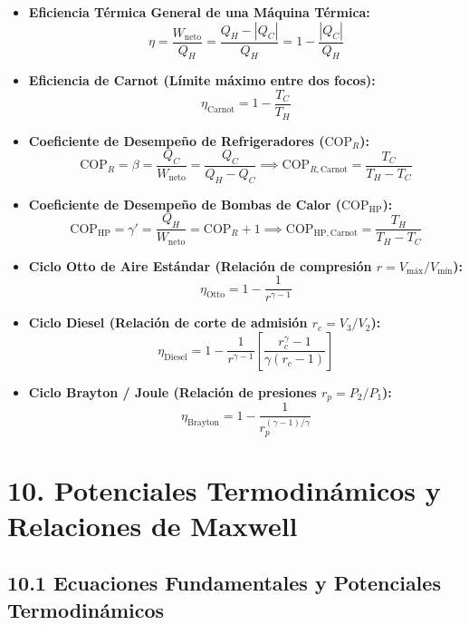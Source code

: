 \documentclass[11pt,a4paper]{article}
\begin{document}
\begin{itemize}
  \item \textbf{Eficiencia Térmica General de una Máquina Térmica:}
  \[
    \eta = \frac{W_{\text{neto}}}{Q_H} = \frac{Q_H - |Q_C|}{Q_H} = 1 - \frac{|Q_C|}{Q_H}
  \]
  \item \textbf{Eficiencia de Carnot (Límite máximo entre dos focos):}
  \[
    \eta_{\text{Carnot}} = 1 - \frac{T_C}{T_H}
  \]
  \item \textbf{Coeficiente de Desempeño de Refrigeradores ($\mathrm{COP}_R$):}
  \[
    \mathrm{COP}_R = \beta = \frac{Q_C}{W_{\text{neto}}} = \frac{Q_C}{Q_H - Q_C} \implies \mathrm{COP}_{R,\text{Carnot}} = \frac{T_C}{T_H - T_C}
  \]
  \item \textbf{Coeficiente de Desempeño de Bombas de Calor ($\mathrm{COP}_{\mathrm{HP}}$):}
  \[
    \mathrm{COP}_{\mathrm{HP}} = \gamma' = \frac{Q_H}{W_{\text{neto}}} = \mathrm{COP}_R + 1 \implies \mathrm{COP}_{\mathrm{HP},\text{Carnot}} = \frac{T_H}{T_H - T_C}
  \]
  \item \textbf{Ciclo Otto de Aire Estándar (Relación de compresión $r = V_{\mathrm{máx}}/V_{\mathrm{mín}}$):}
  \[
    \eta_{\text{Otto}} = 1 - \frac{1}{r^{\gamma - 1}}
  \]
  \item \textbf{Ciclo Diesel (Relación de corte de admisión $r_c = V_3/V_2$):}
  \[
    \eta_{\text{Diesel}} = 1 - \frac{1}{r^{\gamma - 1}} \left[ \frac{r_c^\gamma - 1}{\gamma(r_c - 1)} \right]
  \]
  \item \textbf{Ciclo Brayton / Joule (Relación de presiones $r_p = P_2/P_1$):}
  \[
    \eta_{\text{Brayton}} = 1 - \frac{1}{r_p^{(\gamma - 1)/\gamma}}
  \]
\end{itemize}

\section*{10. Potenciales Termodinámicos y Relaciones de Maxwell}

\subsection*{10.1 Ecuaciones Fundamentales y Potenciales Termodinámicos}
\end{document}
